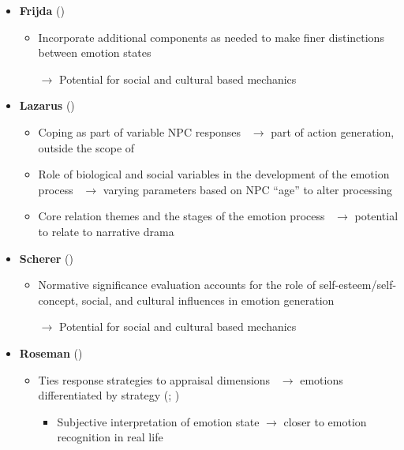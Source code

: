\begin{itemize}
    \item \textbf{Frijda} (\good)
    \begin{itemize}
        \item Incorporate additional components as needed to make finer
        distinctions between emotion states~\citep[p.~216]{frijda1986emotions}

        \item [$\rightarrow$] Potential for social and cultural based mechanics
    \end{itemize}

    \item \textbf{Lazarus} (\good)
    \begin{itemize}
        \item Coping as part of variable NPC
        responses~\citep[p.~112--115]{lazarus1991emotion} $\rightarrow$ part of
        action generation, outside the scope of \progname{}

        \item Role of biological and social variables in the development of the
        emotion process~\citep[p.~39]{lazarus1991emotion} $\rightarrow$ varying
        \progname{} parameters based on NPC ``age'' to alter processing

        \item Core relation themes and the stages of the emotion
        process~\citep[p.~106, 121]{lazarus1991emotion} $\rightarrow$ potential
        to relate to narrative drama
    \end{itemize}

    \item \textbf{Scherer} (\good)
    \begin{itemize}
        \item Normative significance evaluation accounts for the role of
        self-esteem/self-concept, social, and cultural influences in emotion
        generation~\citep[p.~98]{scherer2001appraisalB}

        \item [$\rightarrow$] Potential for social and cultural based mechanics
    \end{itemize}

    \item \textbf{Roseman} (\good)
    \begin{itemize}
        \item Ties response strategies to appraisal
        dimensions~\citep[p.~144]{roseman2013appraisal} $\rightarrow$ emotions
        differentiated by strategy (;
        )
        \begin{itemize}
            \item Subjective interpretation of emotion state $\rightarrow$
            closer to emotion recognition in real life


\end{itemize}
\end{itemize}
\end{itemize}
